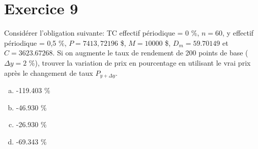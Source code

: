 \documentclass[10pt,a4paper]{article}
\begin{document}
\section*{Exercice 9}
Considérer l’obligation suivante: TC effectif périodique = 0 \%, $n = 60$, y effectif périodique = 0,5 \%, $P = 7413,72196$ \$, $M= 10000$ \$, $D_m = 59.70149$ et $C = 3623.67268$.  Si on augmente le taux de rendement de 200 points de base ($\Delta y = 2$  \%),  trouver la variation de prix en pourcentage en utilisant le vrai prix après le changement de taux $P_{y+\Delta y}$.

\begin{enumerate}[a)]
\item -119.403 \%
\item -46.930 \%
\item -26.930 \%
\item -69.343 \%
\end{enumerate}
\end{document}
